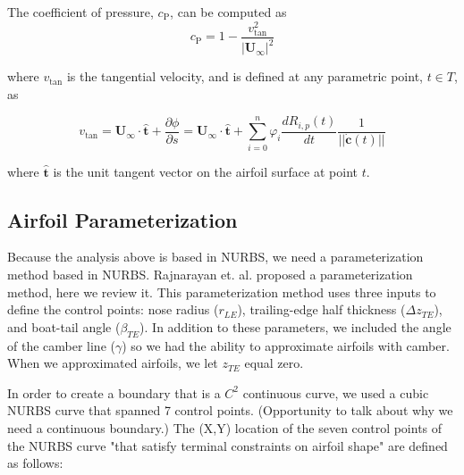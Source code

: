 The coefficient of pressure, \(c_{\mathrm{P}}\), can be computed as
\begin{equation}
c_{\mathrm{P}} = 1 - \frac{v_{\mathrm{tan}}^2}{|\mathbf{U}_{\infty}|^2}
\end{equation}

\noindent where \(v_{\mathrm{tan}}\) is the tangential velocity, and is defined at any parametric point, \(t \in T\), as

\begin{equation}
v_{\mathrm{tan}} = \mathbf{U}_{\infty} \cdot \hat{\mathbf{t}} + \frac{\partial \phi}{\partial s} = \mathbf{U}_{\infty} \cdot \hat{\mathbf{t}} + \sum_{i=0}^{n} \varphi_i \frac{d R_{i,p}(t)}{dt} \frac{1}{||\dot{\mathbf{c}}(t)||}
\end{equation}

\noindent where $\hat{\mathbf{t}}$ is the unit tangent vector on the airfoil surface at point $t$.

\subsection{Airfoil Parameterization}
\label{ssec:airfoilparam}

Because the analysis above is based in NURBS, we need a parameterization method based in NURBS. Rajnarayan et. al. proposed a parameterization method, here we review it. This parameterization method uses three inputs to define the control points: nose radius ($r_{LE}$), trailing-edge half thickness ($\Delta z_{TE}$), and boat-tail angle ($\beta_{TE}$). In addition to these parameters, we included the angle of the camber line ($\gamma$) so we had the ability to approximate airfoils with camber. When we approximated airfoils, we let $z_{TE}$ equal zero.

In order to create a boundary that is a $C^2$ continuous curve, we used a cubic NURBS curve that spanned 7 control points. (Opportunity to talk about why we need a continuous boundary.) The (X,Y) location of the seven control points of the NURBS curve "that satisfy terminal constraints on airfoil shape" are defined as follows: 


